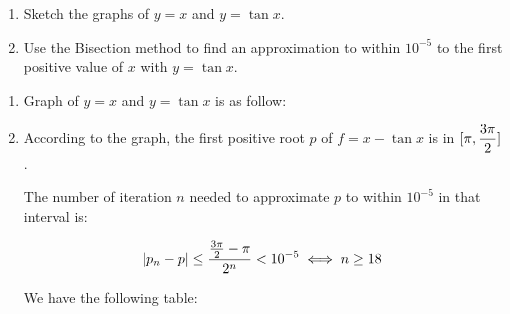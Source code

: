 \documentclass[../../Assignments.tex]{subfiles}
\begin{document}
\begin{exercise}
    \begin{enumerate}[label = (\alph*)]
        \item Sketch the graphs of \(y = x\) and \(y = \tan{x}\).
        \item Use the Bisection method to find an approximation to within
            \(10^{-5}\) to the first positive value of \(x\) with \(y =
            \tan{x}\).
    \end{enumerate}
\end{exercise}

\begin{solution}
    \begin{enumerate}[label = (\alph*)]
        \item Graph of \(y = x\) and \(y = \tan{x}\) is as follow:

            \begin{center}
                
            \end{center}

        \item According to the graph, the first positive root \(p\) of \(f = x -
            \tan{x}\) is in \(\interval{\pi}{\dfrac{3 \pi}{2}}\).

            The number of iteration \(n\) needed to approximate \(p\) to within
            \(10^{-5}\) in that interval is:

            \[\abs{p_n - p} \leq \frac{\frac{3 \pi}{2} - \pi}{2^n} < 10^{-5} \iff n \geq 18\]

            We have the following table:


\end{enumerate}
\end{solution}
\end{document}
